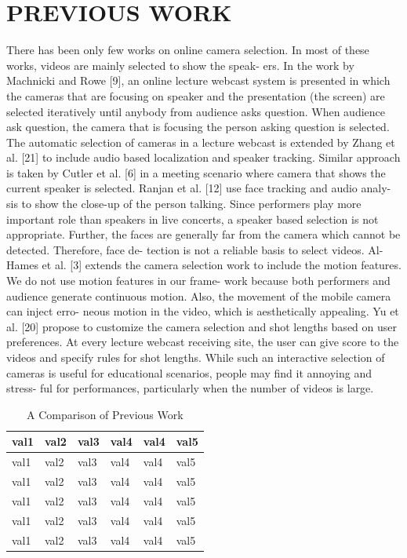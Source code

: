 \documentclass{sig-alternate}
\begin{document}
\section{PREVIOUS WORK}
There has been only few works on online camera selection. In
most of these works, videos are mainly selected to show the speak-
ers. In the work by Machnicki and Rowe [9], an online lecture
webcast system is presented in which the cameras that are focusing
on speaker and the presentation (the screen) are selected iteratively
until anybody from audience asks question. When audience ask
question, the camera that is focusing the person asking question is
selected. The automatic selection of cameras in a lecture webcast
is extended by Zhang et al. [21] to include audio based localization
and speaker tracking. Similar approach is taken by Cutler et al. [6]
in a meeting scenario where camera that shows the current speaker
is selected. Ranjan et al. [12] use face tracking and audio analy-
sis to show the close-up of the person talking. Since performers
play more important role than speakers in live concerts, a speaker
based selection is not appropriate. Further, the faces are generally
far from the camera which cannot be detected. Therefore, face de-
tection is not a reliable basis to select videos.
Al-Hames et al. [3] extends the camera selection work to include
the motion features. We do not use motion features in our frame-
work because both performers and audience generate continuous
motion. Also, the movement of the mobile camera can inject erro-
neous motion in the video, which is aesthetically appealing. Yu et
al. [20] propose to customize the camera selection and shot lengths
based on user preferences. At every lecture webcast receiving site,
the user can give score to the videos and specify rules for shot
lengths. While such an interactive selection of cameras is useful
for educational scenarios, people may find it annoying and stress-
ful for performances, particularly when the number of videos is
large.

\begin{table}
\centering
\caption{ A Comparison of Previous Work }
\begin{tabular}{p{3cm}|p{3cm}|p{3cm}|p{3cm}|p{3cm}|l} \hline
val1&val2&val3&val4&val4&val5\\ \hline
val1&val2&val3&val4&val4&val5\\ \hline
val1&val2&val3&val4&val4&val5\\ \hline
val1&val2&val3&val4&val4&val5\\ \hline
val1&val2&val3&val4&val4&val5\\ \hline
val1&val2&val3&val4&val4&val5\\ \hline
\end{tabular}
\end{table}
\end{document}
